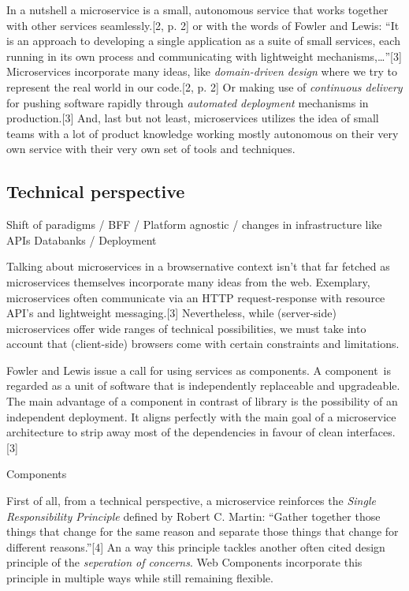 \documentclass[]{assets/latex/ieee}
\begin{document}
In a nutshell a microservice is a small, autonomous service that works
together with other services seamlessly.{[}2, p. 2{]} or with the words
of Fowler and Lewis: ``It is an approach to developing a single
application as a suite of small services, each running in its own
process and communicating with lightweight mechanisms,\ldots{}''{[}3{]}
Microservices incorporate many ideas, like \emph{domain-driven design}
where we try to represent the real world in our code.{[}2, p. 2{]} Or
making use of \emph{continuous delivery} for pushing software rapidly
through \emph{automated deployment} mechanisms in production.{[}3{]}
And, last but not least, microservices utilizes the idea of small teams
with a lot of product knowledge working mostly autonomous on their very
own service with their very own set of tools and techniques.

\subsection{Technical perspective}\label{technical-perspective}

Shift of paradigms / BFF / Platform agnostic / changes in infrastructure
like APIs Databanks / Deployment

Talking about microservices in a browsernative context isn't that far
fetched as microservices themselves incorporate many ideas from the web.
Exemplary, microservices often communicate via an HTTP request-response
with resource API's and lightweight messaging.{[}3{]} Nevertheless,
while (server-side) microservices offer wide ranges of technical
possibilities, we must take into account that (client-side) browsers
come with certain constraints and limitations.

Fowler and Lewis issue a call for using services as components. A
component~is regarded as a unit of software that is independently
replaceable and upgradeable. The main advantage of a component in
contrast of library is the possibility of an independent deployment. It
aligns perfectly with the main goal of a microservice architecture to
strip away most of the dependencies in favour of clean
interfaces.{[}3{]}

Components

First of all, from a technical perspective, a microservice reinforces
the \emph{Single Responsibility Principle} defined by Robert C. Martin:
``Gather together those things that change for the same reason and
separate those things that change for different reasons.''{[}4{]} An a
way this principle tackles another often cited design principle of the
\emph{seperation of concerns}. Web Components incorporate this principle
in multiple ways while still remaining flexible.
\end{document}
